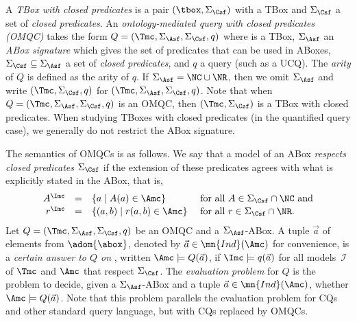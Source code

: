 \documentclass{lmcs}
\theoremstyle{definition}
\begin{document}
A \emph{TBox with closed predicates} is a pair $(\tbox,\Sigma_\Csf)$
with \Tmc a TBox and $\Sigma_\Csf$ a set of \emph{closed
  predicates}. An \emph{ontology-mediated query with closed predicates
  (OMQC)} takes the form $Q=(\Tmc,\Sigma_\Asf,\Sigma_\Csf,q)$ where
\Tmc is a TBox, $\Sigma_\Asf$ an \emph{ABox signature} which gives
the set of predicates that can be used in ABoxes,
$\Sigma_\Csf \subseteq \Sigma_\Asf$ a set of \emph{closed predicates},
and $q$ a query (such as a UCQ). The \emph{arity} of $Q$ is defined as
the arity of $q$.  If $\Sigma_{\Asf}= \NC\cup \NR$, then we omit
$\Sigma_{\Asf}$ and write $(\Tmc,\Sigma_\Csf,q)$ for
$(\Tmc,\Sigma_\Asf,\Sigma_\Csf,q)$.  Note that when
$Q=(\Tmc,\Sigma_\Asf,\Sigma_\Csf,q)$ is an OMQC, then
$(\Tmc,\Sigma_\Csf)$ is a TBox with closed predicates. When studying
TBoxes with closed predicates (in the quantified query case), we 
generally do not restrict the ABox signature.

The semantics of OMQCs is
as follows. We say that a model \Imc of an ABox \Amc \emph{respects
  closed predicates $\Sigma_\Csf$} if the extension of these
predicates agrees with what is explicitly stated in the ABox, that is,
%
$$
\begin{array}{rcl@{\quad}l}
  A^{\Imc} &=& \{a \mid A(a)\in \Amc\} & \text{ for all } A\in
                                         \Sigma_\Csf \cap \NC \text{ and}\\ [0.5mm]
  r^{\Imc} &=& \{(a,b)\mid r(a,b)\in \Amc\} & \text{ for all } r\in \Sigma_\Csf \cap \NR.
\end{array}
$$
%
Let $Q=(\Tmc,\Sigma_\Asf,\Sigma_\Csf,q)$ be an OMQC and \Amc a
$\Sigma_\Asf$-ABox. A tuple $\vec{a}$ of elements from $\adom{\abox}$,
denoted by $\vec{a}\in \mn{Ind}(\Amc)$ for convenience, is a
\emph{certain answer to $Q$ on} \Amc, written $\Amc \models
Q(\vec{a})$, if $\Imc\models q(\vec{a})$ for all models~$\mathcal{I}$
of $\Tmc$ and $\Amc$ that respect $\Sigma_\Csf$. The \emph{evaluation
  problem} for $Q$ is the problem to decide, given a
$\Sigma_\Asf$-ABox \Amc and a tuple $\vec{a} \in \mn{Ind}(\Amc)$,
whether $\Amc \models Q(\vec{a})$. Note that this problem parallels
the evaluation problem for CQs and other standard query language,
but with CQs replaced by OMQCs. 
\end{document}
